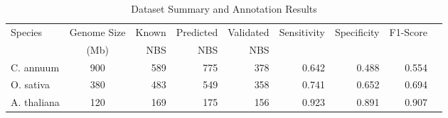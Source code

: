 \begin{table}[htbp]
\centering
\caption{Dataset Summary and Annotation Results}
\label{tab:dataset_summary}
\begin{tabular}{lcrrrrrrr}
\hline
Species & Genome Size & Known & Predicted & Validated & Sensitivity & Specificity & F1-Score \\
        & (Mb)        & NBS   & NBS       & NBS       &             &             &          \\
\hline
C. annuum & 900 & 589 & 775 & 378 & 0.642 & 0.488 & 0.554 \\
O. sativa & 380 & 483 & 549 & 358 & 0.741 & 0.652 & 0.694 \\
A. thaliana & 120 & 169 & 175 & 156 & 0.923 & 0.891 & 0.907 \\
\hline
\end{tabular}
\end{table}
